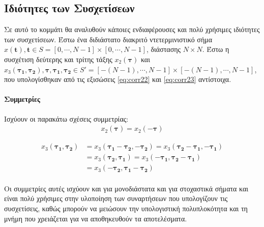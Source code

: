 \subsection{Ιδιότητες των Συσχετίσεων} \label{sec:properties}
Σε αυτό το κομμάτι θα αναλυθούν κάποιες ενδιαφέρουσες και πολύ χρήσιμες ιδιότητες των συσχετίσεων. Έστω ένα διδιάστατο διακριτό ντετερμινιστικό σήμα $x(\textbf{t}),\textbf{t}\in S = [0, \cdots ,N-1]\times[0, \cdots ,N-1]$, διάστασης $N \times N$. Έστω η συσχέτιση δεύτερης και τρίτης τάξης $x_2(\boldsymbol{\tau})$ και $x_3(\boldsymbol{\tau_1},\boldsymbol{\tau_2}), \boldsymbol{\tau}, \boldsymbol{\tau_1}, \boldsymbol{\tau_2} \in S'=[-(N-1), \cdots ,N-1]\times[-(N-1), \cdots ,N-1]$, που υπολογίσθηκαν από τις εξισώσεις \ref{eq:corr22} και \ref{eq:corr23} αντίστοιχα.
\paragraph*{Συμμετρίες}
Ισχύουν οι παρακάτω σχέσεις συμμετρίας:
\begin{align}
x_2(\boldsymbol{\tau}) = x_2(-\boldsymbol{\tau})
\end{align}

\begin{align} \label{eq:symmetries}
 x_3(\boldsymbol{\tau_1},\boldsymbol{\tau_2}) &= x_3(\boldsymbol{\tau_1}-\boldsymbol{\tau_2},-\boldsymbol{\tau_2}) = x_3(\boldsymbol{\tau_2}-\boldsymbol{\tau_1},-\boldsymbol{\tau_1}) \nonumber\\
    &= x_3(\boldsymbol{\tau_2},\boldsymbol{\tau_1}) = x_3(-\boldsymbol{\tau_1},\boldsymbol{\tau_2}-\boldsymbol{\tau_1}) \\
    &= x_3(-\boldsymbol{\tau_2},\boldsymbol{\tau_1}-\boldsymbol{\tau_2})  \nonumber 
\end{align}
\\Οι συμμετρίες αυτές ισχύουν και για μονοδιάστατα και για στοχαστικά σήματα και είναι πολύ χρήσιμες στην υλοποίηση των συναρτήσεων που υπολογίζουν τις συσχετίσεις, καθώς μπορούν να μειώσουν την υπολογιστική πολυπλοκότητα και τη μνήμη που χρειάζεται για να αποθηκευθούν τα αποτελέσματα.

